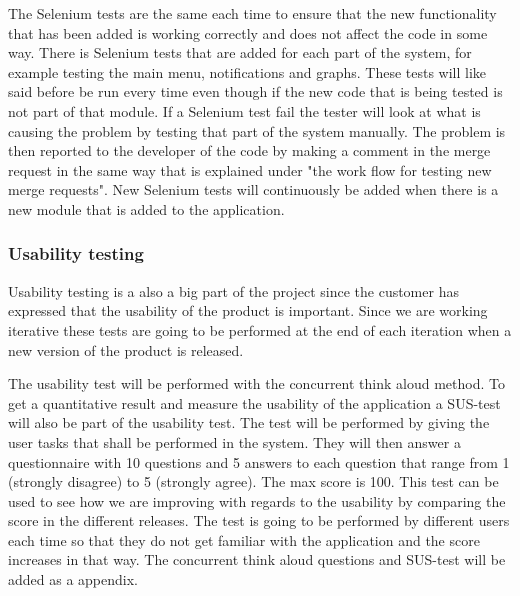 \noindent The Selenium tests are the same each time to ensure that the new functionality that has been added is working correctly and does not affect the code in some way. There is Selenium tests that are added for each part of the system, for example testing the main menu, notifications and graphs. These tests will like said before be run every time even though if the new code that is being tested is not part of that module. If a Selenium test fail the tester will look at what is causing the problem by testing that part of the system manually. The problem is then reported to the developer of the code by making a comment in the merge request in the same way that is explained under "the work flow for testing new merge requests". New Selenium tests will continuously be added when there is a new module that is added to the application. \\

\subsubsection{Usability testing}
 Usability testing is a also a big part of the project since the customer has expressed that the usability of the product is important. Since we are working iterative these tests are going to be performed at the end of each iteration when a new version of the product is released. \newline

\noindent The usability test will be performed with the concurrent think aloud method. To get a quantitative result and measure the usability of the application a SUS-test will also be part of the usability test. The test will be performed by giving the user tasks that shall be performed in the system. They will then answer a questionnaire with 10 questions and 5 answers to each question that range from 1 (strongly disagree) to 5 (strongly agree). The max score is 100. This test can be used to see how we are improving with regards to the usability by comparing the score in the different releases. The test is going to be performed by different users each time so that they do not get familiar with the application and the score increases in that way. The concurrent think aloud questions and SUS-test will be
added as a appendix.\newline

